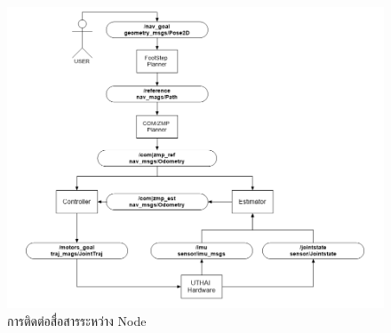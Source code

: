 \begin{figure}[h!]
	\centering
	\includegraphics[width=\textwidth]{chapter3/images/uthai_ros_node.png}
	\caption{การติดต่อสื่อสารระหว่าง Node}
	\label{fig:uthai_ros_node}
\end{figure}

